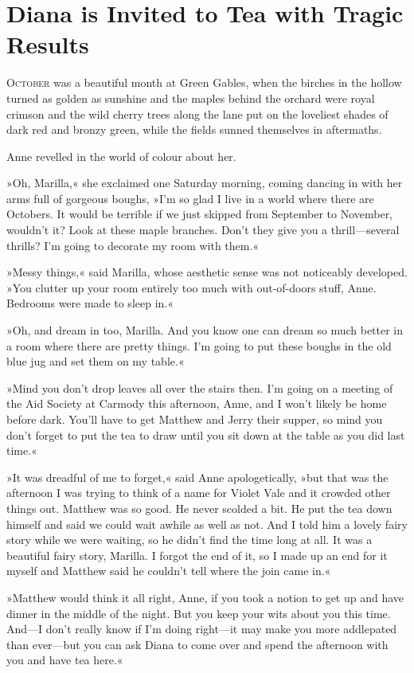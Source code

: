 \chapter{Diana is Invited to Tea with Tragic Results}

\lettrine[lines=4]{O}{ctober} was a beautiful month at Green Gables, when the birches in the hollow turned as golden as sunshine and the maples behind the orchard were royal crimson and the wild cherry trees along the lane put on the loveliest shades of dark red and bronzy green, while the fields sunned themselves in aftermaths.

Anne revelled in the world of colour about her.

»Oh, Marilla,« she exclaimed one Saturday morning, coming dancing in with her arms full of gorgeous boughs, »I'm so glad I live in a world where there are Octobers. It would be terrible if we just skipped from September to November, wouldn't it? Look at these maple branches. Don't they give you a thrill—several thrills? I'm going to decorate my room with them.«

»Messy things,« said Marilla, whose aesthetic sense was not noticeably developed. »You clutter up your room entirely too much with out-of-doors stuff, Anne. Bedrooms were made to sleep in.«

»Oh, and dream in too, Marilla. And you know one can dream so much better in a room where there are pretty things. I'm going to put these boughs in the old blue jug and set them on my table.«

»Mind you don't drop leaves all over the stairs then. I'm going on a meeting of the Aid Society at Carmody this afternoon, Anne, and I won't likely be home before dark. You'll have to get Matthew and Jerry their supper, so mind you don't forget to put the tea to draw until you sit down at the table as you did last time.«

»It was dreadful of me to forget,« said Anne apologetically, »but that was the afternoon I was trying to think of a name for Violet Vale and it crowded other things out. Matthew was so good. He never scolded a bit. He put the tea down himself and said we could wait awhile as well as not. And I told him a lovely fairy story while we were waiting, so he didn't find the time long at all. It was a beautiful fairy story, Marilla. I forgot the end of it, so I made up an end for it myself and Matthew said he couldn't tell where the join came in.«

»Matthew would think it all right, Anne, if you took a notion to get up and have dinner in the middle of the night. But you keep your wits about you this time. And—I don't really know if I'm doing right—it may make you more addlepated than ever—but you can ask Diana to come over and spend the afternoon with you and have tea here.«

